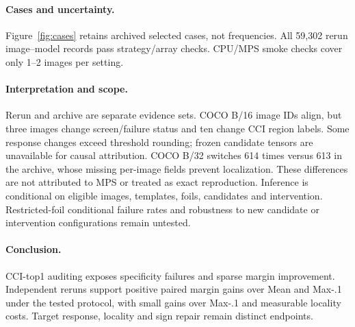\documentclass[10pt]{article}
\begin{document}
\paragraph{Cases and uncertainty.}
Figure~\ref{fig:cases} retains archived selected cases, not frequencies.
All 59,302 rerun image--model records pass strategy/array checks.
CPU/MPS smoke checks cover only 1--2 images per setting.

\paragraph{Interpretation and scope.}
Rerun and archive are separate evidence sets. COCO B/16 image IDs align,
but three images change screen/failure status and ten change CCI region labels.
Some response changes exceed threshold rounding; frozen candidate tensors are
unavailable for causal attribution. COCO B/32 switches 614 times versus 613
in the archive, whose missing per-image fields prevent localization.
These differences are not attributed to MPS or treated as exact reproduction.
Inference is conditional on eligible images, templates, foils, candidates and
intervention. Restricted-foil conditional failure rates and robustness to new
candidate or intervention configurations remain untested.

\paragraph{Conclusion.}
CCI-top1 auditing exposes specificity failures and sparse margin improvement.
Independent reruns support positive paired margin gains over Mean and Max-.1
under the tested protocol, with small gains over Max-.1 and measurable locality
costs. Target response, locality and sign repair remain distinct endpoints.

\clearpage
\balance


\end{document}
